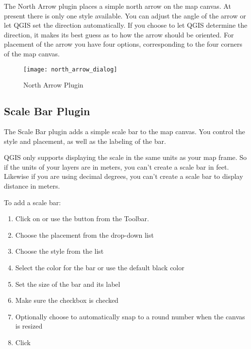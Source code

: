 The North Arrow plugin places a simple north arrow on the map canvas. At
present there is only one style available. You can adjust the angle of the
arrow or let QGIS set the direction automatically. If you choose to let
QGIS determine the direction, it makes its best guess as to how the arrow
should be oriented. For placement of the arrow you have four options,
corresponding to the four corners of the map canvas.

\begin{figure}[ht]
   \centering
   \texttt{[image: north\_arrow\_dialog]}
   \caption{North Arrow Plugin \nixcaption}\label{fig:north_arrow}
\end{figure}

\subsection{Scale Bar Plugin}
The Scale Bar plugin adds a simple scale bar to the map canvas. You
control the style and placement, as well as the labeling of the bar.

QGIS only supports displaying the scale in the same units as your map frame. So
if the units of your layers are in meters, you can't create a scale bar in
feet. Likewise if you are using decimal degrees, you can't create a scale
bar to display distance in meters.

To add a scale bar:

\begin{enumerate}
\item Click on  \arrow {} \arrow {} or use the  button from the Toolbar.
\item Choose the placement from the  drop-down list
\item Choose the style from the  list
\item Select the color for the bar  or use the default black color
\item Set the size of the bar and its label 
\item Make sure the  checkbox is checked
\item Optionally choose to automatically snap to a round number when the
  canvas is resized 
\item Click 
\end{enumerate}

